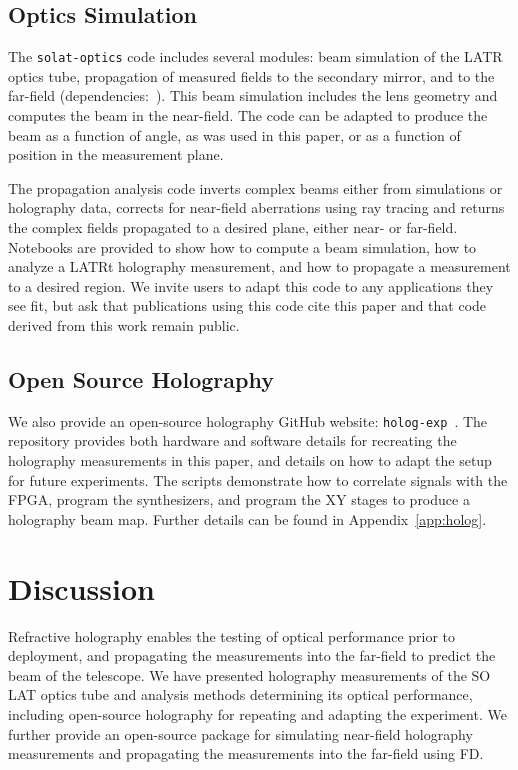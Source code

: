 \subsection{Optics Simulation}
The \verb|solat-optics| code includes several modules: beam simulation of the LATR optics tube, propagation of measured fields to the secondary mirror, and to the far-field (dependencies:~\cite{2020NumPy-Array,2020SciPy-NMeth,hunter2007matplotlib,reback2020pandas,mpiPython,tqdm}).  This beam simulation includes the lens geometry and computes the beam in the near-field.  The code can be adapted to produce the beam as a function of angle, as was used in this paper, or as a function of position in the measurement plane.  

The propagation analysis code inverts complex beams either from simulations or holography data, corrects for near-field aberrations using ray tracing and returns the complex fields propagated to a desired plane, either near- or far-field.   Notebooks are provided to show how to compute a beam simulation, how to analyze a LATRt holography measurement, and how to propagate a measurement to a desired region.  We invite users to adapt this code to any applications they see fit, but ask that publications using this code cite this paper and that code derived from this work remain public.

\subsection{Open Source Holography}
We also provide an open-source holography GitHub website:  \verb|holog-exp|~\cite{holog-exp}.  The repository provides both hardware and software details for recreating the holography measurements in this paper, and details on how to adapt the setup for future experiments.  The scripts demonstrate how to correlate signals with the FPGA, program the synthesizers, and program the XY stages to produce a holography beam map.  Further details can be found in Appendix~\ref{app:holog}.

\section{Discussion}
\label{sec:discussion}
Refractive holography enables the testing of optical performance prior to deployment, and propagating the measurements into the far-field to predict the beam of the telescope.  We have presented holography measurements of the SO LAT optics tube and analysis methods determining its optical performance, including open-source holography for repeating and adapting the experiment.  We further provide an open-source package for simulating near-field holography measurements and propagating the measurements into the far-field using FD. 

